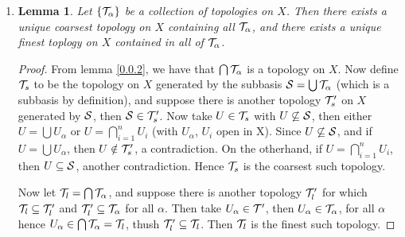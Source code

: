 \documentclass[12pt]{book}
\theoremstyle{plain}
\newtheorem{lemma}[theorem]{Lemma}
\theoremstyle{plain} %
\theoremstyle{definition}
\theoremstyle{remark}
\newtheorem*{remark}{Remark}
\begin{document}
\begin{enumerate}[label=(\arabic*)]
\begin{proof}
        Similarly let $\{U_i\}_{i=1}^{n}$ be a collection with $U_i$ open in  $X$ under  $\Tc_i$,
        for  $1 \leq i \leq n$, then by similar reasoning,  $U_i \in \Tc_i$, and hence so is
        $\bigcap_{i=1}^{n}{U_i}$, hence $\bigcap_{i=1}^{n}{U_i} \in \Tc$. This makes $\Tc$ a
        topology on  $X$.
        \end{proof}
        \begin{remark} 
            Consider $X=\{a,b,c\}$ and the topologies $\Tc_1=\{\emptyset,\{a\},X\}$ and
            $\Tc_2=\{\emptyset, \{b\}, X\}$. Then $\Tc_1 \cup \Tc_2=\{\emptyset, \{a\}, \{b\}, X\}$,
            which is not a topology for it does not contain $\{a,b\}$. In general,
            $\Tc=\bigcup{\Tc_\alpha}$ is not a topology on arbitrary $X$.
        \end{remark}

    \item \begin{lemma}\label{0.0.3}
            Let $\{\mathcal{T}_\alpha\}$ be a collection of topologies on $X$. Then there exists a unique
            coarsest topology on $X$ containing all  $\mathcal{T}_\alpha$, and there exists a unique finest
            toplogy on  $X$ contained in all of  $\mathcal{T}_\alpha$.
      \end{lemma}
      \begin{proof}
          From lemma \ref{0.0.2}, we have that $\bigcap{\mathcal{T}_\alpha}$ is a topology on $X$. Now
          define  $\mathcal{T}_s$ to be the topology on  $X$ generated by the subbasis
          $\mathcal{S}=\bigcup{\mathcal{T}_\alpha}$ (which is a subbasis by definition), and suppose there is
          another topology $\mathcal{T}_s'$ on  $X$ generated by  $\mathcal{S}$, then $\mathcal{S} \in \mathcal{T}_s'$. Now take $U
          \in \mathcal{T}_s$ with  $U \not\subseteq \mathcal{S}$, then either  $U=\bigcup{U_\alpha}$ or
          $U=\bigcap_{i=1}^{n}{U_i}$ (with $U_\alpha$, $U_i$ open in X). Since $U \not\subseteq
          \mathcal{S}$, and if  $U=\bigcup{U_\alpha}$, then $U \notin \mathcal{T}_s'$, a contradiction. On the
          otherhand, if $U=\bigcap_{i=1}^{n}{U_i}$, then  $U \subseteq \mathcal{S}$, another contradiction.
          Hence $\mathcal{T}_s$ is the coarsest such topology.

          Now let $\mathcal{T}_l=\bigcap{\mathcal{T}_\alpha}$, and suppose there is another topology $\mathcal{T}_l'$ for
          which $\mathcal{T}_l \subseteq \mathcal{T}_l'$ and $\mathcal{T}_l' \subseteq \mathcal{T}_\alpha$ for all  $\alpha$. Then
          take  $U_\alpha \in \mathcal{T}'$, then  $U_\alpha \in \mathcal{T}_\alpha$, for all $\alpha$ 
          hence  $U_\alpha \in \bigcap{\mathcal{T}_\alpha}=\mathcal{T}_l$, thush $\mathcal{T}_l' \subseteq \mathcal{T}_l$. 
          Then $\mathcal{T}_l$ is the finest such topology.
      \end{proof}


\end{enumerate}
\end{document}
